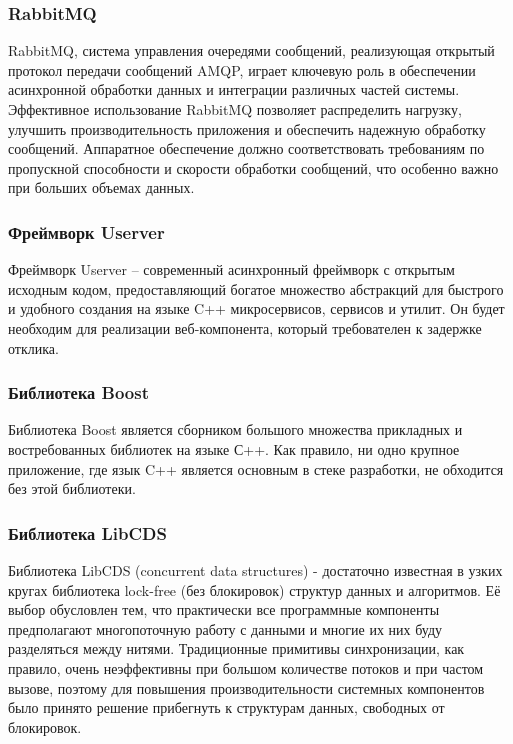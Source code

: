 \subsubsection{RabbitMQ} 
RabbitMQ, система управления очередями сообщений, реализующая открытый протокол передачи сообщений AMQP, играет ключевую роль в обеспечении асинхронной обработки данных и интеграции различных частей системы. Эффективное использование RabbitMQ позволяет распределить нагрузку, улучшить производительность приложения и обеспечить надежную обработку сообщений. Аппаратное обеспечение должно соответствовать требованиям по пропускной способности и скорости обработки сообщений, что особенно важно при больших объемах данных.

\subsubsection{Фреймворк Userver}
Фреймворк Userver -- современный асинхронный фреймворк с открытым исходным кодом, предоставляющий богатое множество абстракций для быстрого и удобного создания на языке C++ микросервисов, сервисов и утилит. Он будет необходим для реализации веб-компонента, который требователен к задержке отклика.

\subsubsection{Библиотека Boost}

Библиотека Boost является сборником большого множества прикладных и востребованных библиотек на языке С++. Как правило, ни одно крупное приложение, где язык C++ является основным в стеке разработки, не обходится без этой библиотеки.
 
\subsubsection{Библиотека LibCDS}

Библиотека LibCDS (concurrent data structures) - достаточно известная в узких кругах библиотека lock-free (без блокировок) структур данных и алгоритмов. Её выбор обусловлен тем, что практически все программные компоненты предполагают многопоточную работу с данными и многие их них буду разделяться между нитями. Традиционные примитивы синхронизации, как правило, очень неэффективны при большом количестве потоков и при частом вызове, поэтому для повышения производительности системных компонентов было принято решение прибегнуть к структурам данных, свободных от блокировок.

